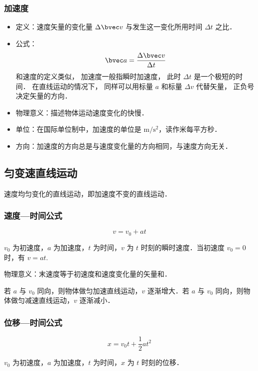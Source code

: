 \subsubsection{加速度}
\begin{itemize}
\item 定义：速度矢量的变化量 $\Delta \bvec v$ 与发生这一变化所用时间 $\Delta t$ 之比．
\item 公式：
\begin{equation}
\bvec a=\frac{\Delta \bvec v}{\Delta t}
\end{equation}
和速度的定义类似， 加速度一般指瞬时加速度， 此时 $\Delta t$ 是一个极短的时间． 在直线运动的情况下， 同样可以用标量 $a$ 和标量 $\Delta v$ 代替矢量， 正负号决定矢量的方向．
\item 物理意义：描述物体运动速度变化的快慢．
\item 单位：在国际单位制中，加速度的单位是 $\mathrm{m/s^2}$，读作米每平方秒．
\item 方向：加速度的方向总是与速度变化量的方向相同，与速度方向无关．
\end{itemize}

\subsection{匀变速直线运动}
速度均匀变化的直线运动，即加速度不变的直线运动．
\subsubsection{速度—时间公式}
\begin{equation}\label{HSPM01_eq1}
v=v_0+at
\end{equation}

$v_0$ 为初速度，$a$ 为加速度，$t$ 为时间，$v$ 为 $t$ 时刻的瞬时速度．当初速度 $v_0=0$ 时，有 $v=at$.

物理意义：末速度等于初速度和速度变化量的矢量和．

若 $a$ 与 $v_0$ 同向，则物体做匀加速直线运动，$v$ 逐渐增大．若 $a$ 与 $v_0$ 同向，则物体做匀减速直线运动，$v$ 逐渐减小．

\subsubsection{位移—时间公式}
\begin{equation}\label{HSPM01_eq2}
x=v_0 t+\frac12at^2
\end{equation}

$v_0$ 为初速度，$a$ 为加速度，$t$ 为时间，$x$ 为 $t$ 时刻的位移．

